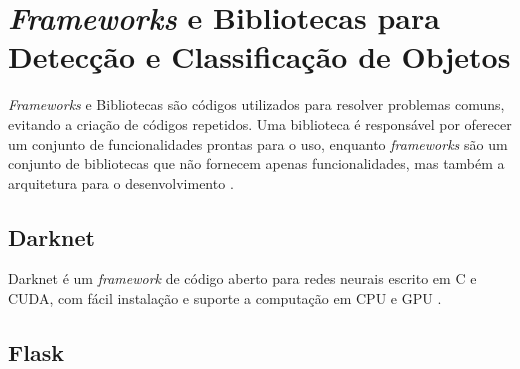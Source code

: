 
\section{\textit{Frameworks} e Bibliotecas para Detecção e Classificação de Objetos} \label{cap:fund-frameworks}
\textit{Frameworks} e Bibliotecas são códigos utilizados para resolver problemas comuns, evitando a criação de códigos repetidos. Uma biblioteca é responsável por oferecer um conjunto de funcionalidades prontas para o uso, enquanto \textit{frameworks} são um conjunto de bibliotecas que não fornecem apenas funcionalidades, mas também a arquitetura para o desenvolvimento \cite{ref:Tamenaoul}.


\subsection{Darknet} \label{cap:fund-frameworks-darknet}
Darknet é um \textit{framework} de código aberto para redes neurais escrito em C e CUDA, com fácil instalação e suporte a computação em CPU e GPU \cite{ref:Redmon}.

\subsection{Flask} \label{cap:fund-frameworks-flask}
